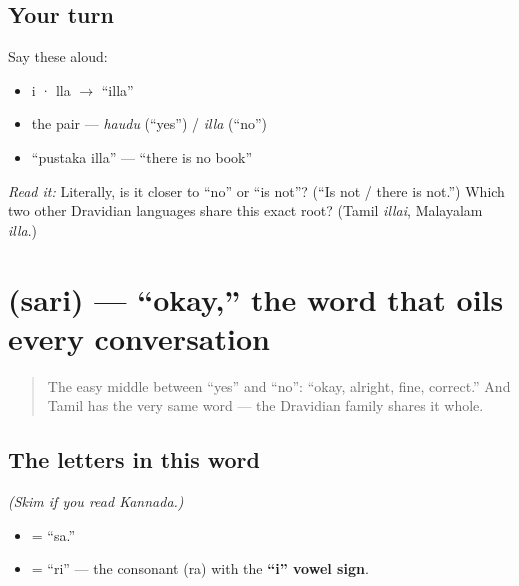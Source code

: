 \subsection*{Your turn}
Say these aloud:

\begin{itemize}
\raggedright
  \item i · lla $\to$ \textquotedblleft{}illa\textquotedblright{}
  \item the pair — \emph{haudu} (\textquotedblleft{}yes\textquotedblright{}) / \emph{illa} (\textquotedblleft{}no\textquotedblright{})
  \item \textquotedblleft{}pustaka illa\textquotedblright{} — \textquotedblleft{}there is no book\textquotedblright{}
\end{itemize}

\begin{tcolorbox}[breakable,colback=teal!4,colframe=teal!35!black,title={Before you move on}]
\emph{Read it:} \textbf{} Literally, is it closer to \textquotedblleft{}no\textquotedblright{} or \textquotedblleft{}is not\textquotedblright{}? (\textquotedblleft{}Is not / there is not.\textquotedblright{}) Which two other Dravidian languages share this exact root? (Tamil \emph{illai}, Malayalam \emph{illa}.)
\end{tcolorbox}
\section[\texorpdfstring{\kn{ಸರಿ} (sari)}{ಸರಿ (sari)}]{ (sari) — \textquotedblleft{}okay,\textquotedblright{} the word that oils every conversation}

\label{lesson:KA-C01-sari}



\begin{quote}
The easy middle between \textquotedblleft{}yes\textquotedblright{} and \textquotedblleft{}no\textquotedblright{}: \textquotedblleft{}okay, alright, fine, correct.\textquotedblright{} And Tamil has the very same word — the Dravidian family shares it whole.
\end{quote}

\subsection*{The letters in this word}
\emph{(Skim if you read Kannada.)}

\begin{itemize}
\raggedright
  \item \textbf{} = \textquotedblleft{}sa.\textquotedblright{}
  \item \textbf{} = \textquotedblleft{}ri\textquotedblright{} — the consonant \textbf{} (ra) with the \textbf{\textquotedblleft{}i\textquotedblright{} vowel sign}.
\end{itemize}


